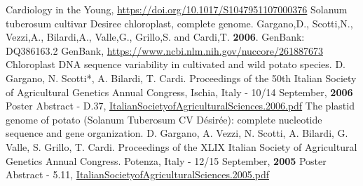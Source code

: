 \documentclass[9pt]{stackoverflow-upgraded-version} %
\begin{document}
\begin{publicationlist}
		{Cardiology in the Young, \href{https://doi.org/10.1017/S1047951107000376}{https://doi.org/10.1017/S1047951107000376}}
	\publication
		{Solanum tuberosum cultivar Desiree chloroplast, complete genome.}
		{Gargano,D., Scotti,N., Vezzi,A., Bilardi,A., Valle,G., Grillo,S. and Cardi,T. \textbf{2006}. GenBank: DQ386163.2}
		{GenBank, \href{https://www.ncbi.nlm.nih.gov/nuccore/261887673}{https://www.ncbi.nlm.nih.gov/nuccore/261887673}}
	\publication
		{Chloroplast DNA sequence variability in cultivated and wild potato species.}
		{D. Gargano, N. Scotti*, A. Bilardi, T. Cardi. Proceedings of the 50th Italian Society of Agricultural Genetics Annual Congress, Ischia, Italy - 10/14 September, \textbf{2006}}
		{Poster Abstract - D.37, \href{https://s3-eu-west-1.amazonaws.com/cdn.bilardi.net/resume/publications/ItalianSocietyofAgriculturalSciences.2006.pdf}{ItalianSocietyofAgriculturalSciences.2006.pdf}}
	\publication
		{The plastid genome of potato (Solanum Tuberosum CV Désirée): complete nucleotide sequence and gene organization.}
		{D. Gargano, A. Vezzi, N. Scotti, A. Bilardi, G. Valle, S. Grillo, T. Cardi. Proceedings of the XLIX Italian Society of Agricultural Genetics Annual Congress. Potenza, Italy - 12/15 September, \textbf{2005}}
		{Poster Abstract - 5.11, \href{https://s3-eu-west-1.amazonaws.com/cdn.bilardi.net/resume/publications/ItalianSocietyofAgriculturalSciences.2005.pdf}{ItalianSocietyofAgriculturalSciences.2005.pdf}}
\end{publicationlist}
\end{document}
